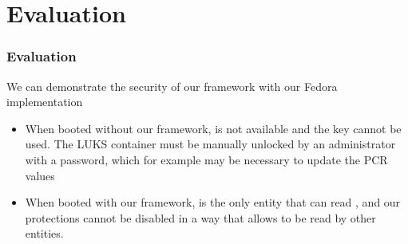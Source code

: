 \documentclass[
  notes,
]{beamer}
\begin{document}
\section{Evaluation}
\begin{frame}
  \frametitle{Evaluation}

  We can demonstrate the security of our framework with our Fedora implementation
  \begin{itemize}
    \item When booted without our framework, \wcp is not available and the key cannot be used. The LUKS container must be manually unlocked by an administrator with a password, which for example may be necessary to update the PCR values
    \item When booted with our framework, \tpmsign is the only entity that can read \wcp, and our protections cannot be disabled in a way that allows \wcp to be read by other entities.
  \end{itemize}
\end{frame}
\begin{NoHyper}
\end{NoHyper}
\end{document}

